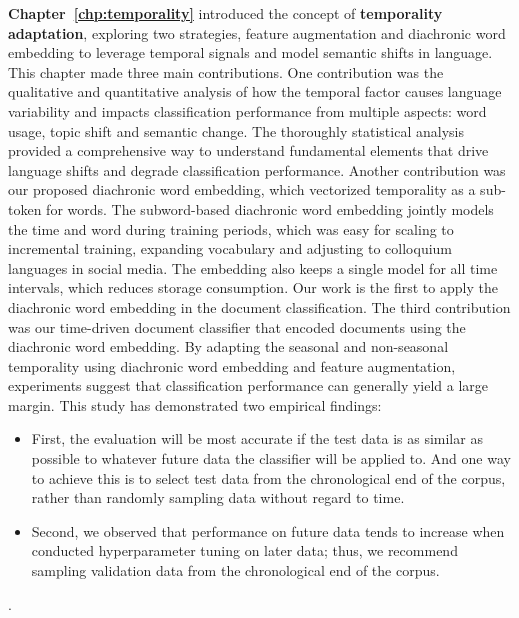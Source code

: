 \textbf{Chapter~\ref{chp:temporality}} introduced the concept of \textbf{temporality adaptation}, exploring two strategies, feature augmentation and diachronic word embedding to leverage temporal signals and model semantic shifts in language. 
This chapter made three main contributions.
One contribution was the qualitative and quantitative analysis of how the temporal factor causes language variability and impacts classification performance from multiple aspects: word usage, topic shift and semantic change.
The thoroughly statistical analysis provided a comprehensive way to understand fundamental elements that drive language shifts and degrade classification performance.
Another contribution was our proposed diachronic word embedding, which vectorized temporality as a sub-token for words.
The subword-based diachronic word embedding jointly models the time and word during training periods, which was easy for scaling to incremental training, expanding vocabulary and adjusting to colloquium languages in social media. 
The embedding also keeps a single model for all time intervals, which reduces storage consumption.
Our work is the first to apply the diachronic word embedding in the document classification. 
The third contribution was our time-driven document classifier that encoded documents using the diachronic word embedding.
By adapting the seasonal and non-seasonal temporality using diachronic word embedding and feature augmentation, 
experiments suggest that classification performance can generally yield a large margin.
This study has demonstrated two empirical findings:
\begin{itemize}
    \item First, the evaluation will be most accurate if the test data is as similar as possible to whatever future data the classifier will be applied to. And one way to achieve this is to select test data from the chronological end of the corpus, rather than randomly sampling data without regard to time.
    \item Second, we observed that performance on future data tends to increase when conducted hyperparameter tuning on later data; thus, we recommend sampling validation data from the chronological end of the corpus.
\end{itemize}.

